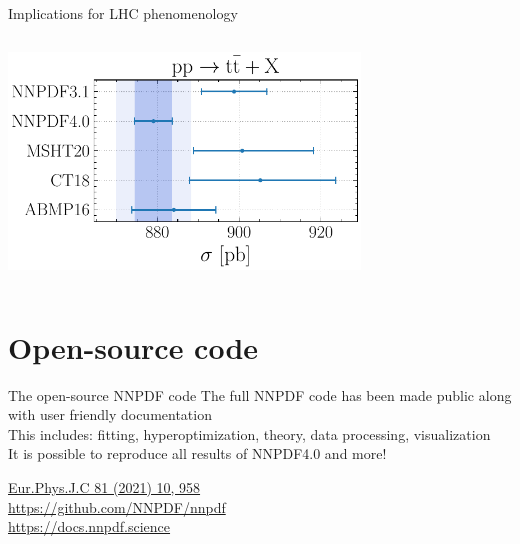 \documentclass[aspectratio=169,9pt]{beamer}
\begin{document}
\begin{frame}[t]{Implications for LHC phenomenology}
\begin{center}
\begin{columns}
\begin{column}{0.48\textwidth}
                  \includegraphics[width=0.7\textwidth]{NNPDF_TTB_14TEV_40_PHENO-integrated}
          \end{column}
        \end{columns}
    \end{center}
\end{frame}


\section{Open-source code}
\begin{frame}[t]{The open-source NNPDF code}
    The full NNPDF code has been made public along with user friendly documentation\\
    \vspace*{1em}
    This includes: fitting, hyperoptimization, theory, data processing, visualization\\
    \vspace*{1em}
    It is possible to reproduce all results of NNPDF4.0 and more!\\
    \vspace*{2em}
    \begin{block}{}
        \centering
		\href{https://link.springer.com/article/10.1140/epjc/s10052-021-09747-9}{Eur.Phys.J.C 81 (2021) 10, 958} \\
		\url{https://github.com/NNPDF/nnpdf} \\
		\url{https://docs.nnpdf.science}
    \end{block}
\end{frame}



\end{document}
